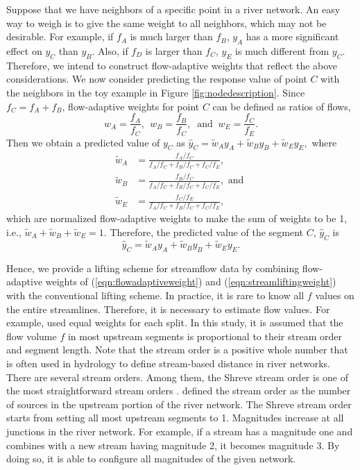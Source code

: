 \documentclass[11pt,titlepage]{article}
\begin{document}
Suppose that we have neighbors of a specific point in a river network. An easy way to weigh is to give the same weight to all neighbors, which may not be desirable. For example, if $f_A$ is much larger than $f_B$, $y_A$ has a more significant effect on $y_C$ than $y_B$. Also, if $f_D$ is larger than $f_C$, $y_E$ is much different from $y_C$. Therefore, we intend to construct flow-adaptive weights that reflect the above considerations. 
We now consider predicting the response value of point $C$ with the neighbors in the toy example in Figure \ref{fig:nodedescription}. Since $f_{C}= f_{A}+ f_{B}$, flow-adaptive weights for point $C$ can be defined as ratios of flows, 
\begin{equation}
w_{A} = \frac{f_{A}}{f_{C}},~~w_{B}=\frac{f_{B}}{f_{C}}, ~\text{ and }~ w_{E}=\frac{f_{C}}{f_{E}}.
\label{eqn:flowadaptiveweight}
\end{equation}
Then we obtain a predicted value of $y_{C}$ as $\hat{y}_{C} = \tilde{w}_{A}y_{A} + \tilde{w}_{B}y_{B} + \tilde{w}_{E}y_{E},$  where
\begin{align}
\tilde{w}_{A} &= \frac{f_{A}/f_{C}}{f_{A}/f_{C} + f_{B}/f_{C} + f_{C}/f_{E}},\nonumber\\
\tilde{w}_{B} &= \frac{f_{B}/f_{C}}{f_{A}/f_{C} + f_{B}/f_{C} + f_{C}/f_{E}}, \text{ and } \label{eqn:streamliftingweight}\\
\tilde{w}_{E} &= \frac{f_{C}/f_{E}}{f_{A}/f_{C} + f_{B}/f_{C} + f_{C}/f_{E}},\nonumber
\end{align}
which are normalized flow-adaptive weights to make the sum of weights to be 1, i.e., $\tilde{w}_A + \tilde{w}_B + \tilde{w}_E = 1$. Therefore, the predicted value of the segment $C$, $\hat{y}_{C}$ is
\[
\hat{y}_{C}  = \tilde{w}_{A}y_{A} + \tilde{w}_{B}y_{B} + \tilde{w}_{E}y_{E}.
\]

Hence, we provide a lifting scheme for streamflow data by combining flow-adaptive weights of (\ref{eqn:flowadaptiveweight}) and (\ref{eqn:streamliftingweight}) with the conventional lifting scheme. In practice, it is rare to know all $f$ values on the entire streamlines. Therefore, it is necessary to estimate flow values. For example, \cite{VerHoef(2006)} used equal weights for each split. In this study, it is assumed that the flow volume $f$ in most upstream segments is proportional to their stream order and segment length. Note that the stream order is a positive whole number that is often used in hydrology to define stream-based distance in river networks. There are several stream orders. Among them, the Shreve stream order is one of the most straightforward stream orders \citep{Cressie2006, VerHoef(2010)}. \cite{Cressie2006} defined the stream order as the number of sources in the upstream portion of the river network. The Shreve stream order starts from setting all most upstream segments to 1. Magnitudes increase at all junctions in the river network. For example, if a stream has a magnitude one and combines with a new stream having magnitude 2, it becomes magnitude 3. By doing so, it is able to configure all magnitudes of the given network.
\end{document}
